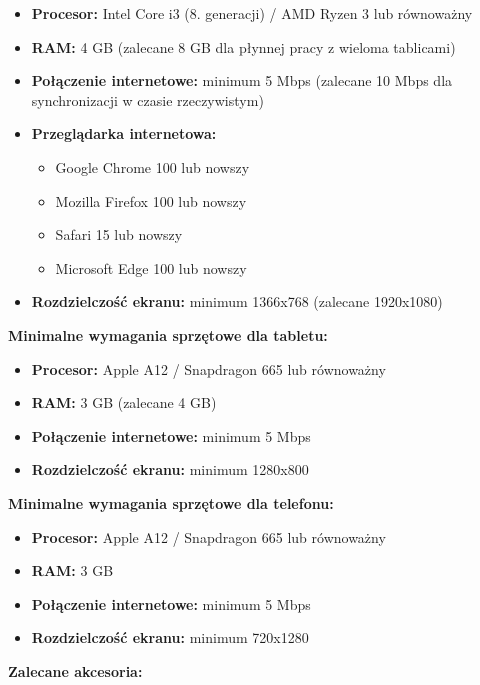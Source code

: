 \documentclass[12pt,a4paper]{article}
\begin{document}
\begin{itemize}[leftmargin=*]
    \item \textbf{Procesor:} Intel Core i3 (8. generacji) / AMD Ryzen 3 lub równoważny
    \item \textbf{RAM:} 4 GB (zalecane 8 GB dla płynnej pracy z wieloma tablicami)
    \item \textbf{Połączenie internetowe:} minimum 5 Mbps (zalecane 10 Mbps dla synchronizacji w czasie rzeczywistym)
    \item \textbf{Przeglądarka internetowa:}
    \begin{itemize}
        \item Google Chrome 100 lub nowszy
        \item Mozilla Firefox 100 lub nowszy
        \item Safari 15 lub nowszy
        \item Microsoft Edge 100 lub nowszy
    \end{itemize}
    \item \textbf{Rozdzielczość ekranu:} minimum 1366x768 (zalecane 1920x1080)
    
\end{itemize}

\textbf{Minimalne wymagania sprzętowe dla tabletu:}

\begin{itemize}[leftmargin=*]
    \item \textbf{Procesor:} Apple A12 / Snapdragon 665 lub równoważny
    \item \textbf{RAM:} 3 GB (zalecane 4 GB)
    \item \textbf{Połączenie internetowe:} minimum 5 Mbps
    \item \textbf{Rozdzielczość ekranu:} minimum 1280x800
\end{itemize}

\textbf{Minimalne wymagania sprzętowe dla telefonu:}

\begin{itemize}[leftmargin=*]
    \item \textbf{Procesor:} Apple A12 / Snapdragon 665 lub równoważny
    \item \textbf{RAM:} 3 GB
    \item \textbf{Połączenie internetowe:} minimum 5 Mbps
    \item \textbf{Rozdzielczość ekranu:} minimum 720x1280
\end{itemize}

\textbf{Zalecane akcesoria:}
\end{document}
